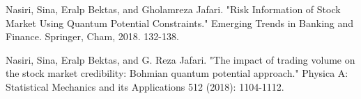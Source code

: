 \documentclass[ aip,jmp,reprint]{revtex4-2}
\begin{document}
\begin{thebibliography}{99}
 Nasiri, Sina, Eralp Bektas, and Gholamreza Jafari. "Risk Information of Stock Market Using Quantum Potential Constraints." Emerging Trends in Banking and Finance. Springer, Cham, 2018. 132-138.

 Nasiri, Sina, Eralp Bektas, and G. Reza Jafari. "The impact of trading volume on the stock market credibility: Bohmian quantum potential approach." Physica A: Statistical Mechanics and its Applications 512 (2018): 1104-1112.


\end{thebibliography}
\end{document}
